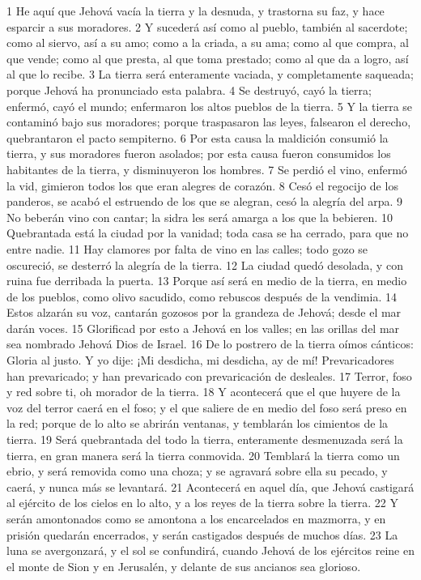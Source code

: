 1 He aquí que Jehová vacía la tierra y la desnuda, y trastorna su faz, y hace esparcir a sus moradores.
2 Y sucederá así como al pueblo, también al sacerdote; como al siervo, así a su amo; como a la criada, a su ama; como al que compra, al que vende; como al que presta, al que toma prestado; como al que da a logro, así al que lo recibe.
3 La tierra será enteramente vaciada, y completamente saqueada; porque Jehová ha pronunciado esta palabra.
4 Se destruyó, cayó la tierra; enfermó, cayó el mundo; enfermaron los altos pueblos de la tierra.
5 Y la tierra se contaminó bajo sus moradores; porque traspasaron las leyes, falsearon el derecho, quebrantaron el pacto sempiterno.
6 Por esta causa la maldición consumió la tierra, y sus moradores fueron asolados; por esta causa fueron consumidos los habitantes de la tierra, y disminuyeron los hombres.
7 Se perdió el vino, enfermó la vid, gimieron todos los que eran alegres de corazón.
8 Cesó el regocijo de los panderos, se acabó el estruendo de los que se alegran, cesó la alegría del arpa.
9 No beberán vino con cantar; la sidra les será amarga a los que la bebieren.
10 Quebrantada está la ciudad por la vanidad; toda casa se ha cerrado, para que no entre nadie.
11 Hay clamores por falta de vino en las calles; todo gozo se oscureció, se desterró la alegría de la tierra.
12 La ciudad quedó desolada, y con ruina fue derribada la puerta.
13 Porque así será en medio de la tierra, en medio de los pueblos, como olivo sacudido, como rebuscos después de la vendimia.
14 Estos alzarán su voz, cantarán gozosos por la grandeza de Jehová; desde el mar darán voces.
15 Glorificad por esto a Jehová en los valles; en las orillas del mar sea nombrado Jehová Dios de Israel.
16 De lo postrero de la tierra oímos cánticos: Gloria al justo. Y yo dije: ¡Mi desdicha, mi desdicha, ay de mí! Prevaricadores han prevaricado; y han prevaricado con prevaricación de desleales.
17 Terror, foso y red sobre ti, oh morador de la tierra.
18 Y acontecerá que el que huyere de la voz del terror caerá en el foso; y el que saliere de en medio del foso será preso en la red; porque de lo alto se abrirán ventanas, y temblarán los cimientos de la tierra.
19 Será quebrantada del todo la tierra, enteramente desmenuzada será la tierra, en gran manera será la tierra conmovida.
20 Temblará la tierra como un ebrio, y será removida como una choza; y se agravará sobre ella su pecado, y caerá, y nunca más se levantará.
21 Acontecerá en aquel día, que Jehová castigará al ejército de los cielos en lo alto, y a los reyes de la tierra sobre la tierra.
22 Y serán amontonados como se amontona a los encarcelados en mazmorra, y en prisión quedarán encerrados, y serán castigados después de muchos días.
23 La luna se avergonzará, y el sol se confundirá, cuando Jehová de los ejércitos reine en el monte de Sion y en Jerusalén, y delante de sus ancianos sea glorioso.

